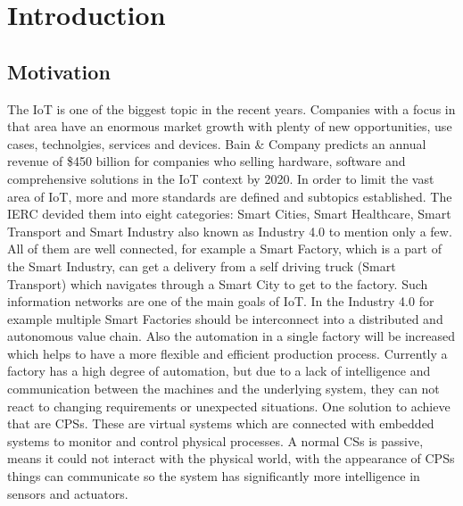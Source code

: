 \chapter{Introduction}

\section{Motivation}

The \ac{IoT} is one of the biggest topic in the recent years.
Companies with a focus in that area have an enormous market growth with plenty of new opportunities, use cases, technolgies, services and devices.
Bain \& Company predicts an annual revenue of \$450 billion for companies who selling hardware, software and comprehensive solutions in the \ac{IoT} context by 2020.\cite{Bosche:2016}
In order to limit the vast area of \ac{IoT}, more and more standards are defined and subtopics established.
The \ac{IERC} devided them into eight categories: Smart Cities, Smart Healthcare, Smart Transport and Smart Industry also known as Industry 4.0 to mention only a few.
All of them are well connected, for example a Smart Factory, which is a part of the Smart Industry, can get a delivery from a self driving truck (Smart Transport) which navigates through a Smart City to get to the factory.
Such information networks are one of the main goals of \ac{IoT}.
In the Industry 4.0 for example multiple Smart Factories should be interconnect into a distributed and autonomous value chain.
Also the automation in a single factory will be increased which helps to have a more flexible and efficient production process.
Currently a factory has a high degree of automation, but due to a lack of intelligence and communication between the machines and the underlying system, they can not react to changing requirements or unexpected situations.
One solution to achieve that are \acp{CPS}.
These are virtual systems which are connected with embedded systems to monitor and control physical processes.\cite{Lee:2008}
A normal \acp{CS} is passive, means it could not interact with the physical world, with the appearance of \acp{CPS} things can communicate so the system has significantly more intelligence in sensors and actuators.\cite{Poovendran:2010}

